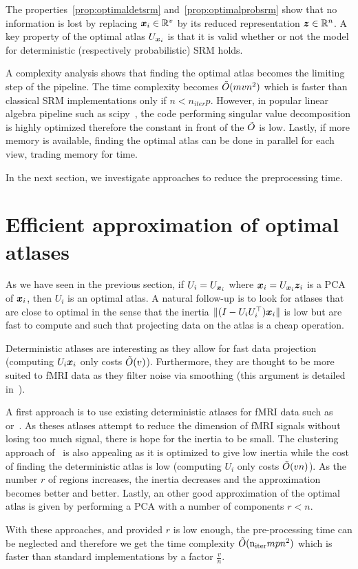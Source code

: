 The properties~\ref{prop:optimaldetsrm} and~\ref{prop:optimalprobsrm} show that
no information is lost by replacing $\boldsymbol{x}_i \in \mathbb{R}^v$ by its reduced representation $\boldsymbol{z} \in \mathbb{R}^n$.
A key property of the optimal atlas $U_{\boldsymbol{x}_i}$ is that it is valid whether or
not the model for deterministic (respectively probabilistic) SRM holds.

A complexity analysis  shows that finding the optimal atlas becomes the limiting step of the pipeline. The time complexity becomes $\tilde{O}(mvn^2)$ which is faster than classical SRM implementations only if $n < n_{iter} p$. However, in popular
linear algebra pipeline such as scipy~\cite{2020SciPy-NMeth}, the code
performing singular value decomposition is highly optimized therefore the
constant in front of the $\tilde{O}$ is low. Lastly, if more memory is available, finding the optimal atlas can be done in parallel for each view, trading memory for time.

In the next section, we investigate approaches to reduce the preprocessing time.

\section{Efficient approximation of optimal atlases}
As we have seen in the previous section, if $U_i = U_{\boldsymbol{x}_i}$ where $\boldsymbol{x}_i =
U_{\boldsymbol{x}_i} \boldsymbol{z}_i$ is a PCA of $\boldsymbol{x}_i$, then $U_i$ is an optimal atlas.
A natural follow-up is to look for atlases that are close to optimal in the
sense that the inertia $\| (I - U_i U_i^{\top}) \boldsymbol{x}_i \|$ is low but are fast to
compute and such that projecting data on the atlas is a cheap operation.

Deterministic atlases are interesting as they allow for fast data projection
(computing $U_i \boldsymbol{x}_i$ only costs $\tilde{O}(v)$). Furthermore, they are thought to
be more suited to fMRI data as they filter noise via smoothing (this argument is
detailed in~\cite{hoyos2018recursive}).

A first approach is to use existing deterministic atlases for fMRI data such as 
~\cite{schaefer2017local} or~\cite{bellec2010multi}. As theses atlases
attempt to reduce the dimension of fMRI signals without losing too much signal,
there is hope for the inertia to be small.
The clustering approach
of~\cite{hoyos2018recursive} is also appealing as it is optimized to give low
inertia while the cost of finding the deterministic atlas is low (computing $U_i$ only costs
$\tilde{O}(vn)$). As the number $r$ of regions increases, the inertia decreases
and the approximation becomes better and better. 
Lastly, an other good approximation of the optimal atlas is given by performing a PCA with a
number of components $r < n$.

With these approaches, and provided $r$ is low enough, the pre-processing time can be neglected and therefore we
get the time complexity $\tilde{O}(\mathrm{n_{iter}} mpn^2)$ which is faster than
standard implementations by a factor $\frac{v}{n}$.
